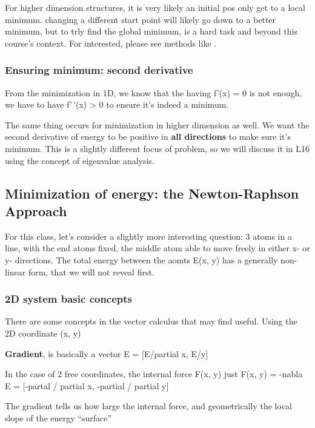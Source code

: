 \documentclass[
  11pt,
  letterpaper,
  DIV=11,
  numbers=noendperiod]{scrartcl}
\begin{document}
For higher dimension structures, it is very likely an initial pos only
get to a local minimum. changing a different start point will likely go
down to a better minimum, but to trly find the global minimum, is a hard
task and beyond this course's context. For interested, please see
methods like .

\subsubsection{Ensuring minimum: second
derivative}\label{ensuring-minimum-second-derivative}

From the minimization in 1D, we know that the having f'(x) = 0 is not
enough, we have to have f'\,'(x) \textgreater{} 0 to ensure it's indeed
a minimum.

The same thing occurs for minimization in higher dimension as well. We
want the second derivative of energy to be positive in \textbf{all
directions} to make sure it's minimum. This is a slightly different
focus of problem, so we will discuss it in L16 using the concept of
eigenvalue analysis.

\subsection{Minimization of energy: the Newton-Raphson
Approach}\label{minimization-of-energy-the-newton-raphson-approach}

For this class, let's consider a slightly more interesting question: 3
atoms in a line, with the end atoms fixed, the middle atom able to move
freely in either x- or y- directions. The total energy between the aomts
E(x, y) has a generally non-linear form, that we will not reveal first.

\subsubsection{2D system basic concepts}\label{d-system-basic-concepts}

There are some concepts in the vector calculus that may find useful.
Using the 2D coordinate (x, y)

\textbf{Gradient}, is basically a vector \nabla E =
{[}\partial E/partial x, \partial E/\partial y{]}

In the case of 2 free coordinates, the internal force F(x, y) just F(x,
y) = -nabla E = {[}-partal / partial x, -partial / partial y{]}

The gradient tells us how large the internal force, and geometrically
the local slope of the energy ``surface''
\end{document}
